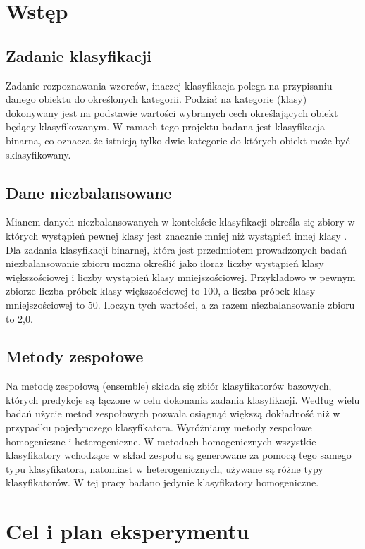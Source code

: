 \documentclass[a4paper,12pt]{article}
\begin{document}
\pagestyle{plain}



\section{Wstęp}
\subsection{Zadanie klasyfikacji}
Zadanie rozpoznawania wzorców, inaczej klasyfikacja polega na przypisaniu danego obiektu do określonych kategorii. Podział na kategorie (klasy) dokonywany jest na podstawie wartości wybranych cech określających obiekt będący klasyfikowanym\cite{def_klasyfikacja}. W ramach tego projektu badana jest klasyfikacja binarna, co oznacza że istnieją tylko dwie kategorie do których obiekt może być sklasyfikowany.
\subsection{Dane niezbalansowane}
Mianem danych niezbalansowanych w kontekście klasyfikacji określa się zbiory w których wystąpień pewnej klasy jest znacznie mniej niż wystąpień innej klasy \cite{def_niezbalansowana}. Dla zadania klasyfikacji binarnej, która jest przedmiotem prowadzonych badań niezbalansowanie zbioru można określić jako iloraz liczby wystąpień klasy większościowej i liczby wystąpień klasy mniejszościowej. Przykładowo w pewnym zbiorze liczba próbek klasy większościowej to 100, a liczba próbek klasy mniejszościowej to 50. Iloczyn tych wartości, a za razem niezbalansowanie zbioru to 2,0. 
\subsection{Metody zespołowe}
Na metodę zespołową (ensemble) składa się zbiór klasyfikatorów bazowych, których predykcje są łączone w celu dokonania zadania klasyfikacji. Według wielu badań użycie metod zespołowych pozwala osiągnąć większą dokładność niż w przypadku pojedynczego klasyfikatora\cite{ensemble}. Wyróżniamy metody zespołowe homogeniczne i heterogeniczne. W metodach homogenicznych wszystkie klasyfikatory wchodzące w skład zespołu są generowane za pomocą tego samego typu klasyfikatora, natomiast w heterogenicznych, używane są różne typy klasyfikatorów. W tej pracy badano jedynie klasyfikatory homogeniczne. 

\newpage
\section{Cel i plan eksperymentu}
\end{document}
